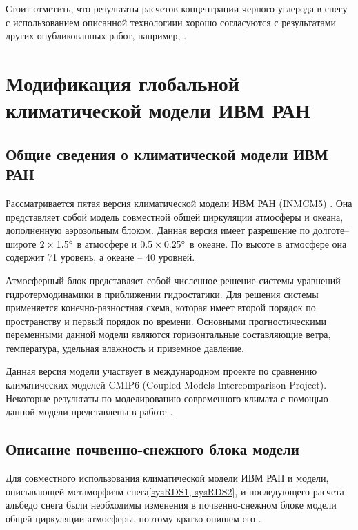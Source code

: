 \documentclass[a4paper, fontsize=14pt]{scrartcl}
\begin{document}
Стоит отметить, что результаты расчетов концентрации черного углерода в снегу с использованием описанной технологиии хорошо согласуются с результатами других опубликованных работ, например, \cite{Flanner2007}.

\newpage
\section{Модификация глобальной климатической модели ИВМ РАН}

\subsection{Общие сведения о климатической модели ИВМ РАН}

Рассматривается пятая версия климатической модели ИВМ РАН (INMCM5) \cite{Volodin2017rus}. Она представляет собой модель совместной общей циркуляции атмосферы и океана, дополненную аэрозольным блоком. Данная версия имеет разрешение по долготе--широте $2 \times 1.5\degree$ в атмосфере и $0.5 \times 0.25\degree$ в океане. По высоте в атмосфере она содержит 71 уровень, а океане -- 40 уровней. \sloppy

Атмосферный блок представляет собой численное решение системы уравнений гидротермодинамики в приближении гидростатики. Для решения системы применяется конечно-разностная схема, которая имеет второй порядок по пространству и первый порядок по времени. Основными прогностическими переменными данной модели являются горизонтальные составляющие ветра, температура, удельная влажность и приземное давление. 

Данная версия модели участвует в международном проекте по сравнению климатических моделей CMIP6 (Coupled Models Intercomparison Project). Некоторые результаты по моделированию современного климата с помощью данной модели представлены в работе \cite{Volodin2017rus}.  \sloppy 


\subsection{Описание почвенно-снежного блока модели}

Для совместного использования климатической модели ИВМ РАН и модели, описывающей метаморфизм снега\eqref{sysRDS1, sysRDS2}, и последующего расчета альбедо снега были необходимы изменения в почвенно-снежном блоке модели общей циркуляции атмосферы, поэтому кратко опишем его \cite{Volodin1998, Volodina2000}.   
\end{document}
